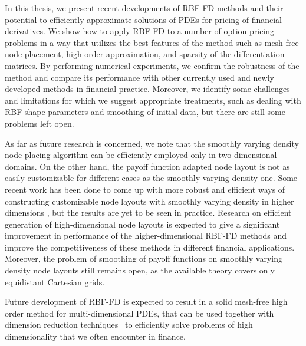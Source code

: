 \documentclass{UUThesisTemplate}
\begin{document}
\par 
In this thesis, we present recent developments of RBF-FD methods and their potential to efficiently approximate solutions of PDEs for pricing of financial derivatives. We show how to apply RBF-FD to a number of option pricing problems in a way that utilizes the best features of the method such as mesh-free node placement, high order approximation, and sparsity of the differentiation matrices. By performing numerical experiments, we confirm the robustness of the method and compare its performance with other currently used and newly developed methods in financial practice. Moreover, we identify some challenges and limitations for which we suggest appropriate treatments, such as dealing with RBF shape parameters and smoothing of initial data, but there are still some problems left open.  

\par
As far as future research is concerned, we note that the smoothly varying density node placing algorithm can be efficiently employed only in two-dimensional domains. On the other hand, the payoff function adapted node layout is not as easily customizable for different cases as the smoothly varying density one. Some recent work has been done to come up with more robust and efficient ways of constructing customizable node layouts with smoothly varying density in higher dimensions \cite{vlasiuk2017fast}, but the results are yet to be seen in practice. Research on efficient generation of high-dimensional node layouts is expected to give a significant improvement in performance of the higher-dimensional RBF-FD methods and improve the competitiveness of these methods in different financial applications. Moreover, the problem of smoothing of payoff functions on smoothly varying density node layouts still remains open, as the available theory covers only equidistant Cartesian grids.

\par
Future development of RBF-FD is expected to result in a solid mesh-free high order method for multi-dimensional PDEs, that can be used together with dimension reduction techniques~\cite{reisinger2015numerical} to efficiently solve problems of high dimensionality that we often encounter in finance.
\end{document}
